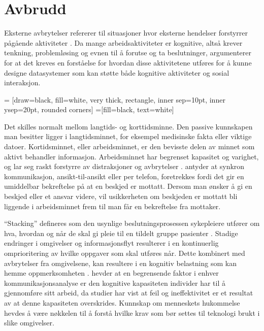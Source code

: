 \section{Avbrudd}
\label{sec:avbrudd}
Eksterne avbrytelser refererer til situasjoner hvor eksterne hendelser forstyrrer pågående aktiviteter \citep{Harr07}. Da mange arbeidsaktiviteter er kognitive, altså krever tenkning, problemløsing og evnen til å forutse og ta beslutninger, argumenterer \citet{Rogers94} for at det kreves en forståelse for hvordan disse aktivitetene utføres for å kunne designe datasystemer som kan støtte både kognitive aktiviteter og sosial interaksjon.

 = [draw=black, fill=white, very thick,
    rectangle, inner sep=10pt, inner ysep=20pt, rounded corners]
 =[fill=black, text=white]
%

\noindent
Det skilles normalt mellom langtids- og korttidsminne. Den passive kunnskapen man besitter ligger i langtidsminnet, for eksempel medisinske fakta eller viktige datoer. Kortidsminnet, eller arbeidsminnet, er den bevisste delen av minnet som aktivt behandler informasjon. Arbeidsminnet har begrenset kapasitet og varighet, og lar seg raskt forstyrre av distraksjoner og avbrytelser \citep{Parker00}. \citet{Coiera98} antyder at synkron kommunikasjon, ansikt-til-ansikt eller per telefon, foretrekkes fordi det gir en umiddelbar bekreftelse på at en beskjed er mottatt. Dersom man ønsker å gi en beskjed eller et ansvar videre, vil usikkerheten om beskjeden er mottatt bli liggende i arbeidsminnet frem til man får en bekreftelse fra mottaker. 

\noindent
“Stacking” defineres som den usynlige beslutningsprosessen sykepleiere utfører om hva, hvordan og når de skal gi pleie til en tildelt gruppe pasienter \citep{Ebright10}. Stadige endringer i omgivelser og informasjonsflyt resulterer i en kontinuerlig omprioritering av hvilke oppgaver som skal utføres når. Dette kombinert med avbrytelser fra omgivelsene, kan resultere i en kognitiv belastning som kan hemme oppmerksomheten \citep{Ebright10}. \citet{Parker00} hevder at en begrensende faktor i enhver kommunikasjonsanalyse er den kognitive kapasiteten individer har til å gjennomføre sitt arbeid, da studier har vist at feil og ineffektivitet er et resultat av at denne kapasiteten overskrides. Kunnskap om menneskets hukommelse hevdes å være nøkkelen til å forstå hvilke krav som bør settes til teknologi brukt i slike omgivelser.

